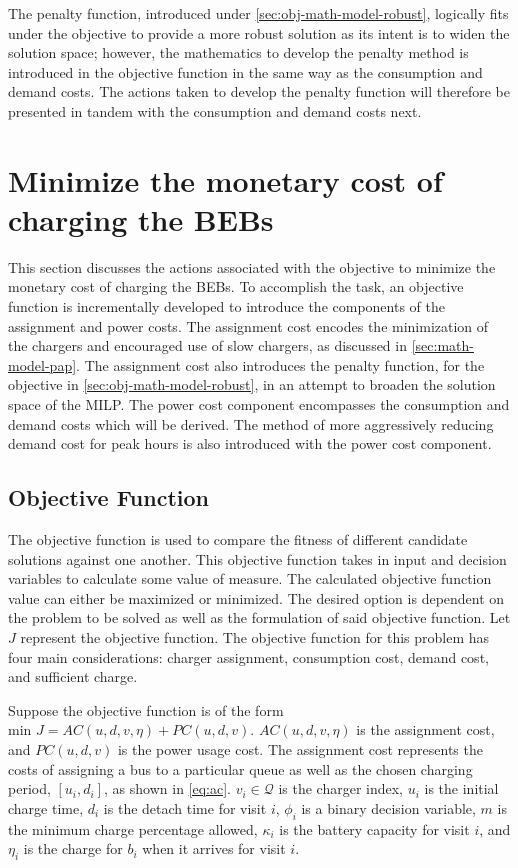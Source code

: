 \documentclass[ee,msthesis]{usuthesis}
\newcommand{\AC}{AC(u, d, v, \eta)}            %
\newcommand{\PC}{PC(u, d, v)}               %
\newcommand{\Qset}{\mathcal{Q}}             %
\begin{document}
The penalty function, introduced under \ref{sec:obj-math-model-robust}, logically fits under the objective to provide a more
robust solution as its intent is to widen the solution space; however, the mathematics to develop the penalty method is
introduced in the objective function in the same way as the consumption and demand costs. The actions taken to develop
the penalty function will therefore be presented in tandem with the consumption and demand costs next.

\section{Minimize the monetary cost of charging the BEBs}
\label{sec:minimize-monetary-cost}
This section discusses the actions associated with the objective to minimize the monetary cost of charging the BEBs. To
accomplish the task, an objective function is incrementally developed to introduce the components of the assignment and
power costs. The assignment cost encodes the minimization of the chargers and encouraged use of slow chargers, as
discussed in \ref{sec:math-model-pap}. The assignment cost also introduces the penalty function, for the objective in
\ref{sec:obj-math-model-robust}, in an attempt to broaden the solution space of the MILP. The power cost component
encompasses the consumption and demand costs which will be derived. The method of more aggressively reducing demand cost
for peak hours is also introduced with the power cost component.

\subsection{Objective Function}
\label{sec:objective-function}
The objective function is used to compare the fitness of different candidate solutions against one another. This
objective function takes in input and decision variables to calculate some value of measure. The calculated objective
function value can either be maximized or minimized. The desired option is dependent on the problem to be solved as well
as the formulation of said objective function. Let \(J\) represent the objective function. The objective function for this
problem has four main considerations: charger assignment, consumption cost, demand cost, and sufficient charge.

Suppose the objective function is of the form \(\text{min } J = \AC + \PC\). \(\AC\) is the assignment cost, and \(\PC\) is
the power usage cost. The assignment cost represents the costs of assigning a bus to a particular queue as well as the
chosen charging period, \([u_i, d_i]\), as shown in \ref{eq:ac}. \(v_i \in \Qset\) is the charger index, \(u_i\) is the initial
charge time, \(d_i\) is the detach time for visit \(i\), \(\phi_i\) is a binary decision variable, \(m\) is the minimum charge
percentage allowed, \(\kappa_i\) is the battery capacity for visit \(i\), and \(\eta_i\) is the charge for \(b_i\) when it
arrives for visit \(i\).
\end{document}
